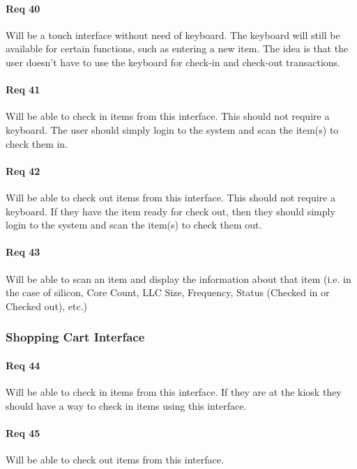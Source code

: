 \documentclass[10pt, onecolumn, twoside, peerreview]{IEEEtran}
\begin{document}
\paragraph*{Req 40} Will be a touch interface without need of keyboard. The keyboard will still be available for certain functions, such as
entering a new item. The idea is that the user doesn’t have to use the keyboard for check-in and check-out
transactions.\\

\paragraph*{Req 41} Will be able to check in items from this interface. This should not require a keyboard. The user should simply login to
the system and scan the item(s) to check them in.\\

\paragraph*{Req 42} Will be able to check out items from this interface. This should not require a keyboard. If they have the item ready
for check out, then they should simply login to the system and scan the item(s) to check them out.\\

\paragraph*{Req 43} Will be able to scan an item and display the information about that item (i.e. in the case of silicon, Core Count, LLC
Size, Frequency, Status (Checked in or Checked out), etc.)\\

\subsubsection{Shopping Cart Interface}
\paragraph*{Req 44} Will be able to check in items from this interface. If they are at the kiosk they should have a way to check in items
using this interface.\\

\paragraph*{Req 45} Will be able to check out items from this interface.\\
\end{document}
